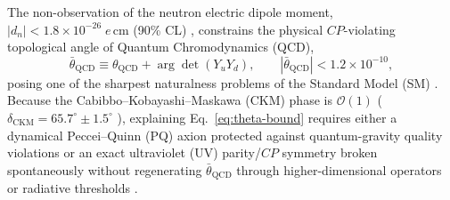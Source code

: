 \documentclass[11pt,a4paper]{article}
\begin{document}
The non-observation of the neutron electric dipole moment, $|d_n| < 1.8\times 10^{-26}\;e\,\mathrm{cm}$ (90\% CL) \cite{Abel2020nEDM,PDG2024}, constrains the physical $CP$-violating topological angle of Quantum Chromodynamics (QCD),
\begin{equation}
\bar{\theta}_{\mathrm{QCD}} \equiv \theta_{\mathrm{QCD}} + \arg\det(Y_u Y_d), \qquad |\bar{\theta}_{\mathrm{QCD}}| < 1.2\times 10^{-10},
\label{eq:theta-bound}
\end{equation}
posing one of the sharpest naturalness problems of the Standard Model (SM) \cite{tHooft1976,JackiwRebbi1976,CallanDashenGross1976,PospelovRitz2005}. Because the Cabibbo--Kobayashi--Maskawa (CKM) phase is $\mathcal{O}(1)$ ($\delta_{\mathrm{CKM}} = 65.7^\circ \pm 1.5^\circ$ \cite{PDG2024}), explaining Eq.~\eqref{eq:theta-bound} requires either a dynamical Peccei--Quinn (PQ) axion \cite{PecceiQuinn1977,Weinberg1978,Wilczek1978,Kim1979,ShifmanVainshteinZakharov1980,Zhitnitsky1980,DineFischlerSrednicki1981} protected against quantum-gravity quality violations \cite{KamionkowskiMarchRussell1992,Holman1992,BarrSeckel1992,DiLuzio2020} or an exact ultraviolet (UV) parity/$CP$ symmetry broken spontaneously without regenerating $\bar{\theta}_{\mathrm{QCD}}$ through higher-dimensional operators or radiative thresholds \cite{Nelson1984,Barr1984,BabuMohapatra1990,Kuchimanchi1996,DineKramerNir1997,HallHarigaya2018,ValentiVecchi2021,FeruglioStrumiaTitov2023}.
\end{document}
